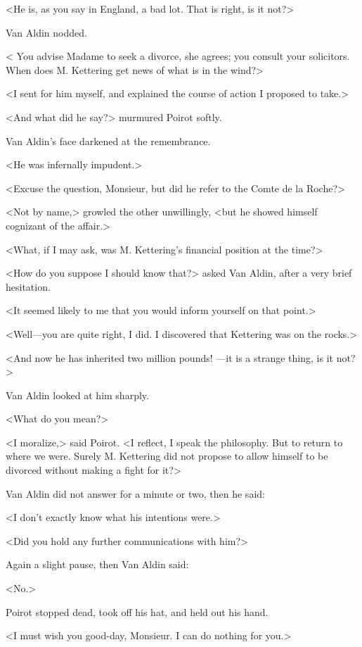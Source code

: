 <He is, as you say in England, a bad lot. That is right, is it not?>

Van Aldin nodded.

< You advise Madame to seek a divorce, she agrees; you consult your solicitors. When does M. Kettering get news of what is in the wind?>

<I sent for him myself, and explained the course of action I proposed to take.>

<And what did he say?> murmured Poirot softly.

Van Aldin's face darkened at the remembrance.

<He was infernally impudent.>

<Excuse the question, Monsieur, but did he refer to the Comte de la Roche?>

<Not by name,> growled the other unwillingly, <but he showed himself cognizant of the affair.>

<What, if I may ask, was M. Kettering's financial position at the time?>

<How do you suppose I should know that?> asked Van Aldin, after a very brief hesitation.

<It seemed likely to me that you would inform yourself on that point.>

<Well—you are quite right, I did. I discovered that Kettering was on the rocks.>

<And now he has inherited two million pounds! —it is a strange thing, is it not?>

Van Aldin looked at him sharply.

<What do you mean?>

<I moralize,> said Poirot. <I reflect, I speak the philosophy. But to return to where we were. Surely M. Kettering did not propose to allow himself to be divorced without making a fight for it?>

Van Aldin did not answer for a minute or two, then he said:

<I don't exactly know what his intentions were.>

<Did you hold any further communications with him?>

Again a slight pause, then Van Aldin said:

<No.>

Poirot stopped dead, took off his hat, and held out his hand.

<I must wish you good-day, Monsieur. I can do nothing for you.>


